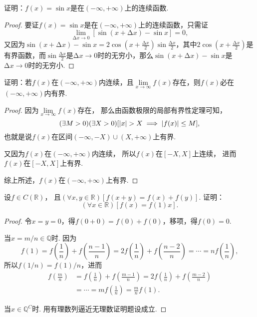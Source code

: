 \begin{example}
证明：\(f(x) = \sin x\)是在\((-\infty,+\infty)\)上的连续函数.
\begin{proof}
要证\(f(x) = \sin x\)是在\((-\infty,+\infty)\)上的连续函数，只需证\[
\lim\limits_{\increment x\to0} [\sin(x+\increment x) - \sin x] = 0,
\]又因为\(
\sin(x+\increment x) - \sin x
= 2 \cos\left(x+\frac{\increment x}{2}\right) \sin\frac{\increment x}{2}
\)，其中\(2 \cos\left(x+\frac{\increment x}{2}\right)\)是有界函数，而\(\sin\frac{\increment x}{2}\)是\(\increment x\to0\)时的无穷小，那么\(\sin(x+\increment x) - \sin x\)是\(\increment x\to0\)时的无穷小.
\end{proof}
\end{example}

\begin{example}
证明：若\(f(x)\)在\((-\infty,+\infty)\)内连续，且\(\lim\limits_{x \to \infty}f(x)\)存在，则\(f(x)\)必在\((-\infty,+\infty)\)内有界.
\begin{proof}
因为\(\lim\limits_{x \to \infty} f(x)\)存在，
那么由函数极限的局部有界性定理可知，\[
	(\exists M>0)
	(\exists X>0)
	[
		\abs{x} > X \implies \abs{f(x)} \leq M
	],
\]
也就是说\(f(x)\)在区间\((-\infty,-X)\cup(X,+\infty)\)上有界.

又因为\(f(x)\)在\((-\infty,+\infty)\)内连续，
所以\(f(x)\)在\([-X,X]\)上连续，
进而\(f(x)\)在\([-X,X]\)上有界.

综上所述，\(f(x)\)在\((-\infty,+\infty)\)上有界.
\end{proof}
\end{example}

\begin{example}
设\(f \in C(\mathbb{R})\)，
且\((\forall x,y\in\mathbb{R})[f(x+y) = f(x) + f(y)]\).
证明：\[
	(\forall x\in\mathbb{R})[f(x) = f(1) x].
\]
\begin{proof}
\def\f#1#2{f\left(\frac{#1}{#2}\right)}
令\(x=y=0\)，得\(f(0+0) = f(0) + f(0)\)，移项，得\(f(0) = 0\).

当\(x = m/n \in \mathbb{Q}\)时.
因为\[
	f(1) = \f{1}{n} + \f{n-1}{n}
	= 2 \f{1}{n} + \f{n-2}{n}
	= \dotsb
	= n \f{1}{n},
\]
所以\(f(1/n) = f(1) / n\)，进而\[
	\begin{split}
	\f{m}{n}
	&= \f{1}{n} + \f{m-1}{n}
	= 2 \f{1}{n} + \f{m-2}{n} \\
	&= \dotsb
	= m \f{1}{n} = \frac{m}{n} f(1).
	\end{split}
\]

当\(x \in \mathbb{Q}^C\)时.
用有理数列逼近无理数证明题设成立.
\end{proof}
\end{example}

